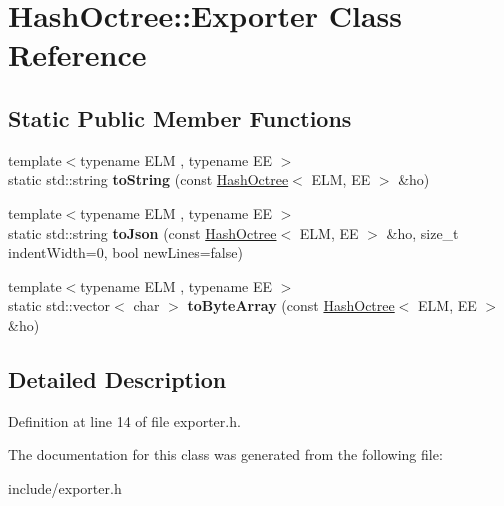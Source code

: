 \hypertarget{class_hash_octree_1_1_exporter}{}\section{Hash\+Octree\+::Exporter Class Reference}
\label{class_hash_octree_1_1_exporter}
\subsection*{Static Public Member Functions}
\begin{DoxyCompactItemize}
\item 
\mbox{\label{class_hash_octree_1_1_exporter_a693b97ba4cd6e0df193591a917372d30}} 
{\footnotesize template$<$typename E\+LM , typename EE $>$ }\\static std\+::string {\bfseries to\+String} (const \mbox{\hyperlink{class_hash_octree_1_1_hash_octree}{Hash\+Octree}}$<$ E\+LM, EE $>$ \&ho)
\item 
\mbox{\label{class_hash_octree_1_1_exporter_a7b05477689e2207ab443fc47814dd947}} 
{\footnotesize template$<$typename E\+LM , typename EE $>$ }\\static std\+::string {\bfseries to\+Json} (const \mbox{\hyperlink{class_hash_octree_1_1_hash_octree}{Hash\+Octree}}$<$ E\+LM, EE $>$ \&ho, size\+\_\+t indent\+Width=0, bool new\+Lines=false)
\item 
\mbox{\label{class_hash_octree_1_1_exporter_a37c03bb9572a0ae2c9dfc795c3dc2472}} 
{\footnotesize template$<$typename E\+LM , typename EE $>$ }\\static std\+::vector$<$ char $>$ {\bfseries to\+Byte\+Array} (const \mbox{\hyperlink{class_hash_octree_1_1_hash_octree}{Hash\+Octree}}$<$ E\+LM, EE $>$ \&ho)
\end{DoxyCompactItemize}


\subsection{Detailed Description}


Definition at line 14 of file exporter.\+h.



The documentation for this class was generated from the following file\+:\begin{DoxyCompactItemize}
\item 
include/exporter.\+h\end{DoxyCompactItemize}
